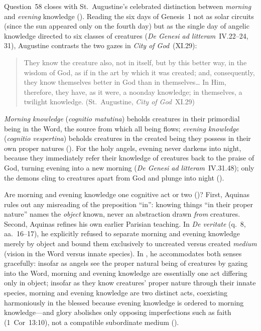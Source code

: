 Question~58 closes with St.~Augustine's celebrated distinction between \emph{morning} and \emph{evening} knowledge (). Reading the six days of Genesis~1 not as solar circuits (since the sun appeared only on the fourth day) but as the single day of angelic knowledge directed to six classes of creatures (\emph{De Genesi ad litteram}~IV.22--24, 31), Augustine contrasts the two gazes in \emph{City of God}~(XI.29):
\begin{quotation}
They know the creature also, not in itself, but by this better way, in the wisdom of God, as if in the art by which it was created; and, consequently, they know themselves better in God than in themselves\dots{} In Him, therefore, they have, as it were, a noonday knowledge; in themselves, a twilight knowledge. (St.~Augustine, \emph{City of God}~XI.29)
\end{quotation}
\emph{Morning knowledge} (\emph{cognitio matutina}) beholds creatures in their primordial being in the Word, the source from which all being flows; \emph{evening knowledge} (\emph{cognitio vespertina}) beholds creatures in the created being they possess in their own proper natures (). For the holy angels, evening never darkens into night, because they immediately refer their knowledge of creatures back to the praise of God, turning evening into a new morning (\emph{De Genesi ad litteram}~IV.31.48); only the demons cling to creatures apart from God and plunge into night ().

Are morning and evening knowledge one cognitive act or two ()? First, Aquinas rules out any misreading of the preposition ``in'': knowing things ``in their proper nature'' names the \emph{object} known, never an abstraction drawn \emph{from} creatures. Second, Aquinas refines his own earlier Parisian teaching. In \emph{De veritate} (q.~8, aa.~16--17), he explicitly refused to separate morning and evening knowledge merely by object and bound them exclusively to uncreated versus created \emph{medium} (vision in the Word versus innate species). In , he accommodates both senses gracefully: insofar as angels see the proper natural being of creatures by gazing into the Word, morning and evening knowledge are essentially one act differing only in object; insofar as they know creatures' proper nature through their innate species, morning and evening knowledge are two distinct acts, coexisting harmoniously in the blessed because evening knowledge is ordered to morning knowledge---and glory abolishes only opposing imperfections such as faith (1~Cor~13:10), not a compatible subordinate medium ().

